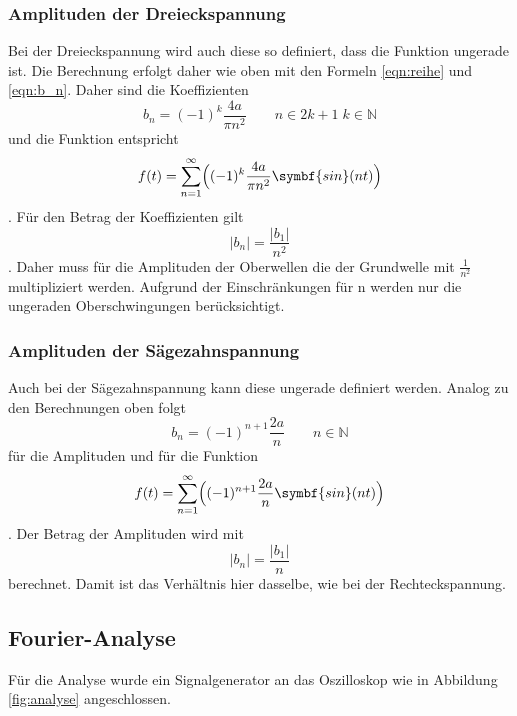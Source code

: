 \subsubsection{Amplituden der Dreieckspannung}
Bei der Dreieckspannung wird auch diese so definiert, dass die Funktion ungerade ist.
Die Berechnung erfolgt daher wie oben mit den Formeln \ref{eqn:reihe} und \ref{eqn:b_n}.
Daher sind die Koeffizienten
\begin{equation*}
    b_n=(-1)^k\frac{4a}{\pi n^2} \qquad n\in2k+1 \; k\in\mathbb{N}
    \label{eqn:amp_drei}
\end{equation*}   
und die Funktion entspricht
\begin{equation*}
    f(t)=\sum_{n=1}^{\infty}\Bigl((-1)^k \frac{4a}{ \pi n^2} \symbf{sin}(n t)\Bigr) 
    \label{eqn:drei}
\end{equation*}.
Für den Betrag der Koeffizienten gilt
\begin{equation}
    |b_n|=\frac{|b_1|}{n^2}
    \label{eqn:b_drei}
\end{equation}.
Daher muss für die Amplituden der Oberwellen die der Grundwelle mit $\frac{1}{n^2}$ multipliziert werden. 
Aufgrund der Einschränkungen für n werden nur die ungeraden Oberschwingungen berücksichtigt.

\subsubsection{Amplituden der Sägezahnspannung}
Auch bei der Sägezahnspannung kann diese ungerade definiert werden.
Analog zu den Berechnungen oben folgt
\begin{equation*}
    b_n=(-1)^{n+1}\frac{2a}{ n} \qquad n\in\mathbb{N}
    \label{eqn:amp_säge}
\end{equation*} 
für die Amplituden und für die Funktion
\begin{equation*}
    f(t)=\sum_{n=1}^{\infty}\Bigl( (-1)^{n+1}\frac{2a}{ n} \symbf{sin}(n t)\Bigr) 
    \label{eqn:drei}
\end{equation*}.
Der Betrag der Amplituden wird mit
\begin{equation}
    |b_n|=\frac{|b_1|}{n} 
    \label{eqn:b_säge}
\end{equation}
berechnet. Damit ist das Verhältnis hier dasselbe, wie bei der Rechteckspannung.

\subsection{Fourier-Analyse}
Für die Analyse wurde ein Signalgenerator an das Oszilloskop wie in Abbildung \ref{fig:analyse} angeschlossen.

